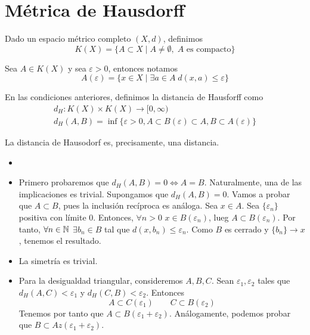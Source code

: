 \documentclass[FyPI.tex]{subfiles}
\begin{document}
\section{Métrica de Hausdorff}
\begin{defi}
Dado un espacio métrico completo $(X,d)$, definimos 
$$
K(X) = \{ A\subset X\mid A\neq \emptyset, \; \text{$A$ es compacto}\}
$$
\end{defi}
\begin{nota}
Sea $A \in K(X)$ y sea $\varepsilon >0$, entonces notamos
$$
A(\varepsilon) = \{x\in X \mid \exists a\in A \; d(x,a)\leq \varepsilon\}
$$
\end{nota}
\begin{defi}
En las condiciones anteriores, definimos la distancia de Hausforff como 
\begin{gather*}d_H:K(X)\times K(X)\to [0,\infty)\\
d_H(A,B) = \inf\{\varepsilon>0,A\subset B(\varepsilon)\subset A, B\subset A(\varepsilon)\}
\end{gather*}
\end{defi}
\begin{prop} La distancia de Hausodorf es, precisamente, una distancia.
\end{prop}
\begin{dem}
\begin{itemize}
\item[]
\item Primero probaremos que $d_H(A,B) = 0 \Leftrightarrow A=B$. Naturalmente, una de las implicaciones es trivial. Supongamos que $d_H(A,B)=0$. Vamos a probar que $A\subset B$, pues la inclusión recíproca es análoga. Sea $x \in A$. Sea $\{\varepsilon_n\}$ positiva con límite $0$. Entonces, $\forall n>0$ $x \in B(\varepsilon_n)$, lueg $A\subset B(\varepsilon_n)$. Por tanto, $\forall n \in \mathbb{N}$ $\exists b_n \in B$ tal que $d(x,b_n) \leq \varepsilon_n$. Como $B$ es cerrado y $\{b_n\}\to x$, tenemos el resultado.
\item La simetría es trivial.
\item Para la desigualdad triangular, consideremos $A,B,C$. Sean $\varepsilon_1,\varepsilon_2$ tales que $d_H(A,C)<\varepsilon_1$ y $d_H(C,B)<\varepsilon_2$. Entonces
$$
A\subset C(\varepsilon_1) \qquad C \subset B(\varepsilon_2)
$$
Tenemos por tanto que $A \subset B(\varepsilon_1+\varepsilon_2)$.
Análogamente, podemos probar que $B\subset Az(\varepsilon_1+\varepsilon_2)$.
\end{itemize}
\end{dem}
\end{document}
